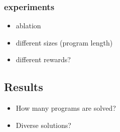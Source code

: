 
\subsubsection{experiments}
\begin{itemize}
    \item ablation
    \item different sizes (program length)
    \item different rewards?
\end{itemize}





















\subsection{Results}
\begin{itemize}
    \item How many programs are solved?
    \item Diverse solutions?
\end{itemize}
























